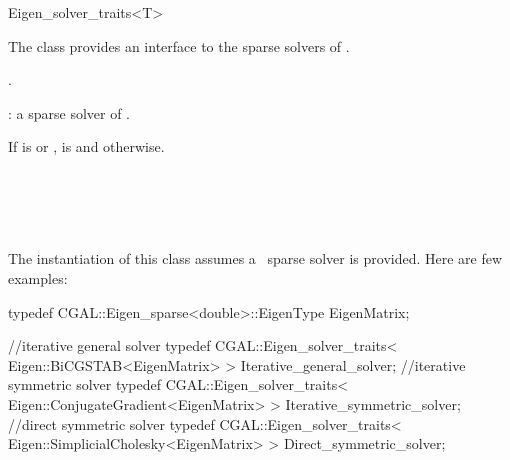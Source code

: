\ccRefPageBegin
\begin{ccRefClass}{Eigen_solver_traits<T>}

\ccDefinition

The class  provides an interface to the sparse solvers of \eigen.


\ccIsModel
{}.

\ccParameters
{}: a sparse solver of \eigen.

\ccTypes
{}
{If  is  or ,  is 
and  otherwise.
}

\ccSeeAlso
\eigenpage\\
  \\
  \\
  \\

\ccExample
The instantiation of this class assumes a \eigen\ sparse solver is provided. Here are few examples:

\begin{ccExampleCode}
typedef CGAL::Eigen_sparse<double>::EigenType EigenMatrix;

//iterative general solver
typedef CGAL::Eigen_solver_traits< Eigen::BiCGSTAB<EigenMatrix> > Iterative_general_solver;
//iterative symmetric solver
typedef CGAL::Eigen_solver_traits< Eigen::ConjugateGradient<EigenMatrix> > Iterative_symmetric_solver;
//direct symmetric solver
typedef CGAL::Eigen_solver_traits< Eigen::SimplicialCholesky<EigenMatrix> > Direct_symmetric_solver;
\end{ccExampleCode}


\end{ccRefClass}

\ccRefPageEnd


